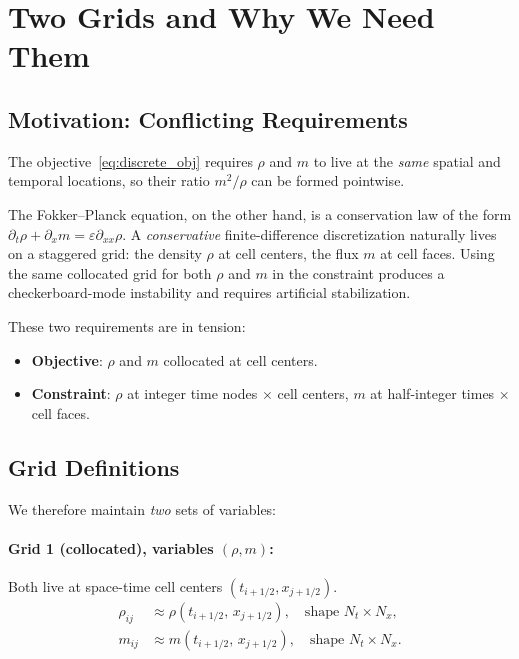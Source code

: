 \documentclass[11pt]{article}
\begin{document}
\section{Two Grids and Why We Need Them}

\subsection{Motivation: Conflicting Requirements}

The objective~\eqref{eq:discrete_obj} requires $\rho$ and $m$ to live at
the \emph{same} spatial and temporal locations, so their ratio $m^2/\rho$
can be formed pointwise.

The Fokker--Planck equation, on the other hand, is a conservation law of the
form $\partial_t\rho + \partial_x m = \varepsilon\partial_{xx}\rho$.  A
\emph{conservative} finite-difference discretization naturally lives on a
staggered grid: the density $\rho$ at cell centers, the flux $m$ at cell
faces.  Using the same collocated grid for both $\rho$ and $m$ in the
constraint produces a checkerboard-mode instability and requires artificial
stabilization.

These two requirements are in tension:
\begin{itemize}
  \item \textbf{Objective}: $\rho$ and $m$ collocated at cell centers.
  \item \textbf{Constraint}: $\rho$ at integer time nodes $\times$ cell
        centers, $m$ at half-integer times $\times$ cell faces.
\end{itemize}

\subsection{Grid Definitions}

We therefore maintain \emph{two} sets of variables:

\paragraph{Grid 1 (collocated), variables $(\rho, m)$:}
Both live at space-time cell centers $(t_{i+1/2}, x_{j+1/2})$.
\begin{align*}
  \rho_{ij} &\approx \rho(t_{i+1/2},\, x_{j+1/2}), \quad
    \text{shape } N_t \times N_x,\\
  m_{ij}    &\approx m(t_{i+1/2},\, x_{j+1/2}), \quad
    \text{shape } N_t \times N_x.
\end{align*}
\end{document}
